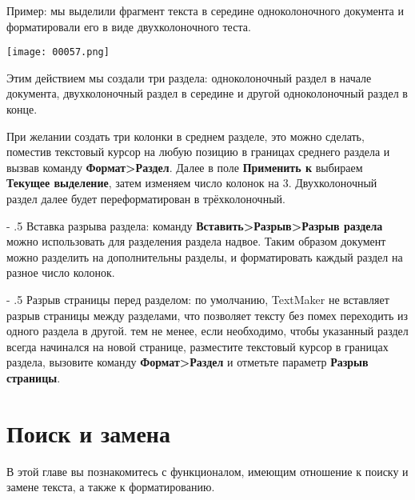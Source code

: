 ﻿\documentclass[a4paper,10pt]{article}
\makeatletter
\renewcommand\paragraph{%
   \@startsection{paragraph}{4}{0mm}%
      {-\baselineskip}%
      {.5\baselineskip}%
      {\normalfont\normalsize\bfseries}}
\makeatother
\begin{document}
Пример: мы выделили фрагмент текста в середине одноколоночного документа и форматировали его в виде двухколоночного теста.

\texttt{[image: 00057.png]}

Этим действием мы создали три раздела: одноколоночный раздел в начале документа, двухколоночный раздел в середине и другой одноколоночный раздел в конце.

При желании создать три колонки в среднем разделе, это можно сделать, поместив текстовый курсор на любую позицию в границах среднего раздела и вызвав команду \textbf{Формат>Раздел}. Далее в поле \textbf{Применить к} выбираем \textbf{Текущее выделение}, затем изменяем число колонок на 3. Двухколоночный раздел далее будет переформатирован в трёхколоночный.

\paragraph{Вставка разрыва раздела:} команду \textbf{Вставить>Разрыв>Разрыв раздела} можно использовать для разделения раздела надвое. Таким образом документ можно разделить на дополнительны разделы, и форматировать каждый раздел на разное число колонок.

\paragraph{Разрыв страницы перед разделом:} по умолчанию, TextMaker не вставляет разрыв страницы между разделами, что позволяет тексту без помех переходить из одного раздела в другой. тем не менее, если необходимо, чтобы указанный раздел всегда начинался на новой странице, разместите текстовый курсор в границах раздела, вызовите команду \textbf{Формат>Раздел} и отметьте параметр \textbf{Разрыв страницы}.


\section{Поиск и замена} \label{sec:поискизамена}
В этой главе вы познакомитесь с функционалом, имеющим отношение к поиску и замене текста, а также к форматированию.
\end{document}
